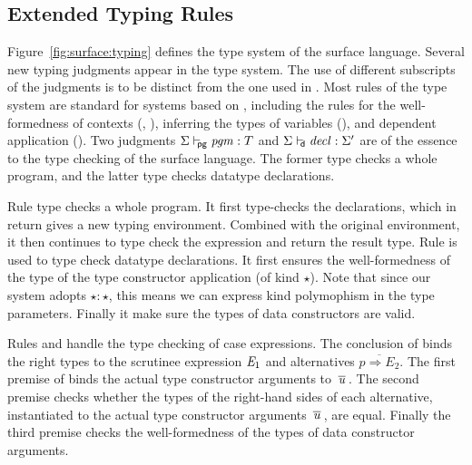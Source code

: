 \subsection{Extended Typing Rules}

Figure~\ref{fig:surface:typing} defines the type system of the surface
language. Several new typing judgments appear in the type system. The
use of different subscripts of the judgments is to be distinct from
the one used in \name. Most rules of the type system are standard for
systems based on \coc, including the rules for the well-formedness of
contexts (, ), inferring the
types of variables (), and dependent application
(). Two judgments $ \Sigma  \vdash_{\!\!\mathsf{pg} }  \mathit{pgm}  :  T $ and
$ \Sigma  \vdash_{\!\!\mathsf{d} }  \mathit{decl}  :  \Sigma' $ are of the essence to the type checking of the
surface language. The former type checks a whole program, and the
latter type checks datatype declarations.

Rule  type checks a whole program. It first
type-checks the declarations, which in return gives a new typing
environment. Combined with the original environment, it then continues
to type check the expression and return the result type. Rule
 is used to type check datatype declarations. It
first ensures the well-formedness of the type of the type constructor
application (of kind $\star$). Note that since our system adopts
$\star : \star$, this means we can express kind polymophism in the
type parameters. Finally it make sure the types of data constructors
are valid.

Rules  and  handle the type
checking of case expressions. The conclusion of 
binds the right types to the scrutinee expression $\mathit{E_{{\mathrm{1}}}}$ and
alternatives $\overline{p \Rightarrow E_2}$. The first premise of
 binds the actual type constructor arguments to
$\,\overline{  \mathit{u}  }\,$. The second premise checks whether the types of the
right-hand sides of each alternative, instantiated to the actual type
constructor arguments $\,\overline{  \mathit{u}  }\,$, are equal. Finally the third
premise checks the well-formedness of the types of data constructor
arguments.


